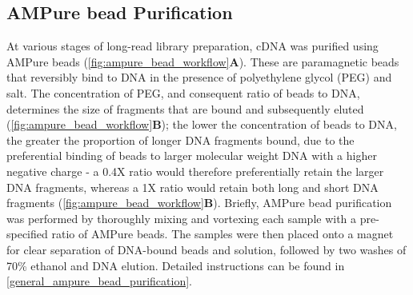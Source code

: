 \subsection{AMPure bead Purification} 
\label{section:ch2_AMPure_explanation} 
At various stages of long-read library preparation, cDNA was purified using AMPure beads (\cref{fig:ampure_bead_workflow}\textbf{A}). These are paramagnetic beads that reversibly bind to DNA in the presence of polyethylene glycol (PEG) and salt. The concentration of PEG, and consequent ratio of beads to DNA, determines the size of fragments that are bound and subsequently eluted (\cref{fig:ampure_bead_workflow}\textbf{B}); the lower the concentration of beads to DNA, the greater the proportion of longer DNA fragments bound, due to the preferential binding of beads to larger molecular weight DNA with a higher negative charge - a 0.4X ratio would therefore preferentially retain the larger DNA fragments, whereas a 1X ratio would retain both long and short DNA fragments (\cref{fig:ampure_bead_workflow}\textbf{B}). Briefly, AMPure bead purification was performed by thoroughly mixing and vortexing each sample with a pre-specified ratio of AMPure beads. The samples were then placed onto a magnet for clear separation of DNA-bound beads and solution, followed by two washes of 70\% ethanol and DNA elution. Detailed instructions can be found in \cref{general_ampure_bead_purification}.

